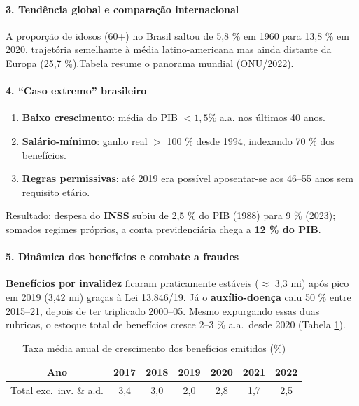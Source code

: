 \documentclass[a4paper,12pt]{article}[abntex2]
\begin{document}
\paragraph{3. Tendência global e comparação internacional}  
A proporção de idosos (60+) no Brasil saltou de 5,8 \% em 1960 para 13,8 \% em 2020, trajetória semelhante à média latino-americana mas ainda distante da Europa (25,7 \%).Tabela resume o panorama mundial (ONU/2022).

\paragraph{4. “Caso extremo” brasileiro}  
\begin{enumerate}
  \item \textbf{Baixo crescimento}: média do PIB $<1,5\%$ a.a. nos últimos 40 anos.  
  \item \textbf{Salário-mínimo}: ganho real $>$ 100 \% desde 1994, indexando 70 \% dos benefícios.  
  \item \textbf{Regras permissivas}: até 2019 era possível aposentar-se aos 46–55 anos sem requisito etário.  
\end{enumerate}
Resultado: despesa do \textbf{INSS} subiu de 2,5 \% do PIB (1988) para 9 \% (2023); somados regimes próprios, a conta previdenciária chega a \textbf{12 \% do PIB}.

\paragraph{5. Dinâmica dos benefícios e combate a fraudes}  
\textbf{Benefícios por invalidez} ficaram praticamente estáveis (\(\approx\) 3,3 mi) após pico em 2019 (3,42 mi) graças à Lei 13.846/19. 
Já o \textbf{auxílio-doença} caiu 50 \% entre 2015–21, depois de ter triplicado 2000–05.
Mesmo expurgando essas duas rubricas, o estoque total de benefícios cresce 2–3 \% a.a.\ desde 2020 (Tabela \ref{tab:var}).

\begin{table}[h]
\centering
\caption{Taxa média anual de crescimento dos benefícios emitidos (\%)}
\label{tab:var}
\begin{tabular}{c|cccccc}
\toprule
Ano & 2017 & 2018 & 2019 & 2020 & 2021 & 2022\\
\midrule
Total exc.\ inv. \& a.d. & 3,4 & 3,0 & 2,0 & 2,8 & 1,7 & 2,5\\
\bottomrule
\end{tabular}
\end{table}
\end{document}
